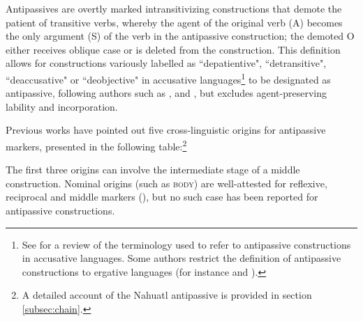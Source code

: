 \documentclass[oldfontcommands,oneside,a4paper,11pt]{article}
\begin{document}
Antipassives  are  overtly marked intransitivizing constructions that demote the patient of transitive verbs, whereby the agent of the original verb (A)  becomes the only argument (S) of the verb in the antipassive construction; the demoted O either receives oblique case or is deleted from the construction. This definition allows for constructions variously labelled as ``depatientive", ``detransitive", ``deaccusative" or ``deobjective" in accusative languages\footnote{See  \citet{janic.these} for a review of the terminology used to refer to antipassive constructions in accusative languages. Some authors restrict the definition of antipassive constructions to ergative languages (for instance \citealt{dixon94erg} and \citealt{cooreman94antipassive}).} to be designated as antipassive, following authors such as \citealt{heath76antipassive}, \citet{polinsky11antipassive} and  	\citet{creissels12antip}, but excludes agent-preserving lability and incorporation.
 


 Previous works have pointed out five cross-linguistic origins for antipassive markers, presented in the following table:\footnote{A detailed account of the Nahuatl antipassive is provided in section \ref{subsec:chain}. }
\begin{table}[H]
 \caption{Attested sources of antipassive markers} \label{tab:sources}
\end{table}
The first three origins can involve the intermediate stage of a middle construction. Nominal origins (such as \textsc{body}) are well-attested for reflexive, reciprocal and middle markers (\citealt[58]{heine-kuteva02}), but no such case has been reported for antipassive constructions. %
\end{document}
